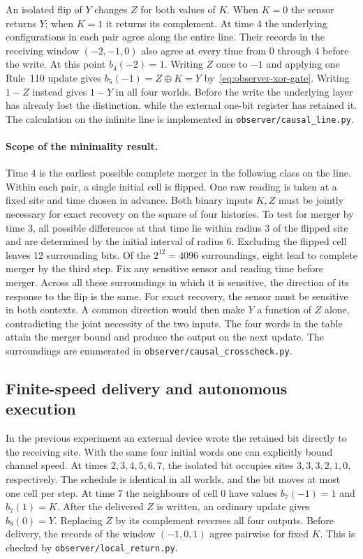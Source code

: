 An isolated flip of $Y$ changes $Z$ for both values of $K$. When $K=0$ the sensor returns $Y$; when $K=1$ it returns its complement. At time 4 the underlying configurations in each pair agree along the entire line. Their records in the receiving window $(-2,-1,0)$ also agree at every time from 0 through 4 before the write. At this point $b_4(-2)=1$. Writing $Z$ once to $-1$ and applying one Rule~110 update gives $b_5(-1)=Z\oplus K=Y$ by~\eqref{eq:observer-xor-gate}. Writing $1-Z$ instead gives $1-Y$ in all four worlds. Before the write the underlying layer has already lost the distinction, while the external one-bit register has retained it. The calculation on the infinite line is implemented in \nolinkurl{observer/causal_line.py}.

\paragraph{Scope of the minimality result.}
Time 4 is the earliest possible complete merger in the following class on the line. Within each pair, a single initial cell is flipped. One raw reading is taken at a fixed site and time chosen in advance. Both binary inputs $K,Z$ must be jointly necessary for exact recovery on the square of four histories. To test for merger by time 3, all possible differences at that time lie within radius 3 of the flipped site and are determined by the initial interval of radius 6. Excluding the flipped cell leaves 12 surrounding bits. Of the $2^{12}=4096$ surroundings, eight lead to complete merger by the third step. Fix any sensitive sensor and reading time before merger. Across all these surroundings in which it is sensitive, the direction of its response to the flip is the same. For exact recovery, the sensor must be sensitive in both contexts. A common direction would then make $Y$ a function of $Z$ alone, contradicting the joint necessity of the two inputs. The four words in the table attain the merger bound and produce the output on the next update. The surroundings are enumerated in \nolinkurl{observer/causal_crosscheck.py}.

\subsection{Finite-speed delivery and autonomous execution}

In the previous experiment an external device wrote the retained bit directly to the receiving site. With the same four initial words one can explicitly bound channel speed. At times $2,3,4,5,6,7$, the isolated bit occupies sites $3,3,3,2,1,0$, respectively. The schedule is identical in all worlds, and the bit moves at most one cell per step. At time 7 the neighbours of cell $0$ have values $b_7(-1)=1$ and $b_7(1)=K$. After the delivered $Z$ is written, an ordinary update gives $b_8(0)=Y$. Replacing $Z$ by its complement reverses all four outputs. Before delivery, the records of the window $(-1,0,1)$ agree pairwise for fixed $K$. This is checked by \nolinkurl{observer/local_return.py}.

